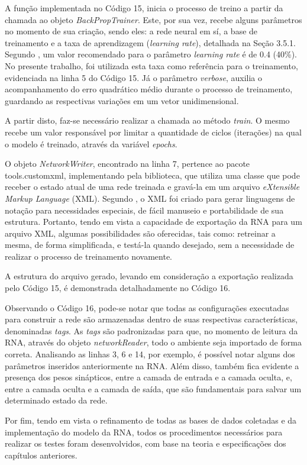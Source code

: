 

A função implementada no Código 15, inicia o processo de treino a partir da chamada ao objeto \textit{BackPropTrainer}. Este, por sua vez, recebe alguns parâmetros no momento de sua criação, sendo eles: a rede neural em sí, a base de treinamento e a taxa de aprendizagem (\textit{learning rate}), detalhada na Seção 3.5.1. Segundo , um valor recomendado para o parâmetro \textit{learning rate} é de 0.4 (40\%). No presente trabalho, foi utilizada esta taxa como referência para o treinamento, evidenciada na linha 5 do Código 15. Já o parâmetro \textit{verbose}, auxilia o acompanhamento do erro quadrático médio durante o processo de treinamento, guardando as respectivas variações em um vetor unidimensional.

A partir disto, faz-se necessário realizar a chamada ao método \textit{train}. O mesmo recebe um valor responsável por limitar a quantidade de ciclos (iterações) na qual o modelo é treinado, através da variável \textit{epochs}.

O objeto \textit{NetworkWriter}, encontrado na linha 7, pertence ao pacote tools.customxml, implementando pela biblioteca, que utiliza uma classe que pode receber o estado atual de uma rede treinada e gravá-la em um arquivo \textit{eXtensible Markup Language} (XML). Segundo , o XML foi criado para gerar linguagens de notação para necessidades especiais, de fácil manuseio e portabilidade de sua estrutura. Portanto, tendo em vista a capacidade de exportação da RNA para um arquivo XML, algumas possibilidades são oferecidas, tais como: retreinar a mesma, de forma simplificada, e testá-la quando desejado, sem a necessidade de realizar o processo de treinamento novamente.

A estrutura do arquivo gerado, levando em consideração a exportação realizada pelo Código 15, é demonstrada detalhadamente no Código 16.



Observando o Código 16, pode-se notar que todas as configurações executadas para construir a rede são armazenadas dentro de suas respectivas características, denominadas \textit{tags}. As \textit{tags} são padronizadas para que, no momento de leitura da RNA, através do objeto \textit{networkReader}, todo o ambiente seja importado de forma correta. Analisando as linhas 3, 6 e 14, por exemplo, é possível notar alguns dos parâmetros inseridos anteriormente na RNA. Além disso, também fica evidente a presença dos pesos sinápticos, entre a camada de entrada e a camada oculta, e, entre a camada oculta e a camada de saída, que são fundamentais para salvar um determinado estado da rede.

Por fim, tendo em vista o refinamento de todas as bases de dados coletadas e da implementação do modelo da RNA, todos os procedimentos necessários para realizar os testes foram desenvolvidos, com base na teoria e especificações dos capítulos anteriores. 